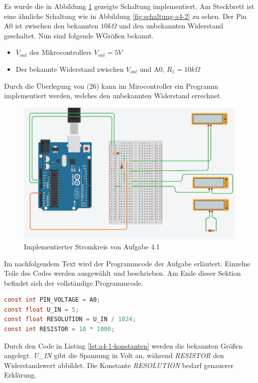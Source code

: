 Es wurde die in Abbildung \ref{fig:a4-1-implemtierung} gezeigte Schaltung implementiert.
Am Steckbrett ist eine ähnliche Schaltung wie in Abbildung \ref{fig:schaltung-a4-2} zu sehen.
Der Pin A0 ist zwischen den bekannten $10k\Omega$ und den unbekannten Widerstand geschaltet.
Nun sind folgende WGrößen bekannt.

\begin{itemize}
    \item $V_{out}$ des Mikrocontrollers $V_{out} = 5V$
    \item Der bekannte Widerstand zwischen $V_{out}$ und A0, $R_1 = 10k\Omega$
\end{itemize}

Durch die Überlegung von (26) kann im Mirocontroller ein Programm implementiert werden, welches den unbekannten Widerstand errechnet.

\begin{figure}[ht]
\centering
\includegraphics[width=\textwidth]{pictures/a4-1-praktik.png}
\caption{Implementierter Stromkreis von Aufgabe 4.1}
\label{fig:a4-1-implemtierung}
\end{figure}

Im nachfolgendem Text wird der Programmcode der Aufgabe erläutert.
Einzelne Teile des Codes werden ausgewählt und beschrieben.
Am Ende dieser Sektion befindet sich der vollständige Programmcode.

\begin{lstlisting}[language=C,label={lst:a4-1-konstanten}, caption={Konstanten der Aufgabe 4.1}]
const int PIN_VOLTAGE = A0;
const float U_IN = 5;
const float RESOLUTION = U_IN / 1024;
const int RESISTOR = 10 * 1000;
\end{lstlisting}

Durch den Code in Listing \ref{lst:a4-1-konstanten} werden die bekannten Größen angelegt.
\textit{U\_IN} gibt die Spannung in Volt an, während \textit{RESISTOR} den Widerstandswert abbildet.
Die Konstante \textit{RESOLUTION} bedarf genauerer Erklärung.

